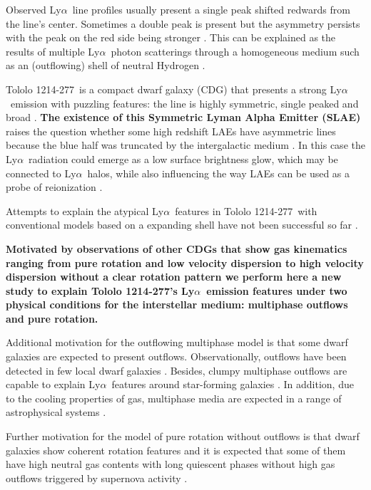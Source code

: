 \documentclass[a4paper,fleqn,usenatbib]{mnras}
\newcommand{\tol}{Tololo 1214-277}
\newcommand{\lya}{\ifmmode{{\rm Ly}\alpha}\else Ly$\alpha$\ \fi}
\begin{document}
Observed \lya line profiles usually present a single peak shifted
redwards from the line's center. 
Sometimes a double peak is present but the asymmetry persists with 
the peak on the red side being stronger \citep[e.g.][]{2010ApJ...717..289S,Erb14,Trainor16}. 
This can be explained as the results of multiple \lya photon
scatterings through a homogeneous medium such as an (outflowing) shell of neutral Hydrogen
\citep{2006A&A...460..397V,Orsi12,2012ApJ...751...29Y,2015ApJ...812..123G}.

\tol\ is a compact dwarf galaxy (CDG) that presents a
strong \lya emission with puzzling 
features: the line is highly symmetric, single peaked and broad 
\citep{Thuan97}.
{\bf The existence of this Symmetric Lyman Alpha Emitter (SLAE)} raises the question whether some high
redshift LAEs have asymmetric lines because the blue half was
truncated by the intergalactic medium \citep{2007MNRAS.377.1175D}. 
In this case the \lya radiation could emerge as a low surface
brightness glow, which may be connected to \lya halos, while also
influencing the way LAEs can be used as a probe of reionization
\citep[see the review by][and references therein]{2014PASA...31...40D}. 

Attempts to explain the atypical \lya features in \tol\ with
conventional models based on a expanding shell have not been successful
so far \citep{mashesse03,2015A&A...578A...7V}. 


{\bf Motivated by observations of other CDGs
  that show gas kinematics ranging from pure rotation and low velocity
dispersion to high velocity dispersion without a clear rotation pattern
\citep{2015A&A...577A..21C,2017A&A...600A.125C} we perform here a new
study to explain \tol's \lya emission features under two physical
conditions for the interstellar medium: multiphase outflows and pure rotation.}


Additional motivation for the outflowing multiphase model \citep[as presented
in][]{Gronke2016} is that some dwarf galaxies are expected to
present outflows.  
Observationally, outflows have been detected in few local dwarf galaxies
\citep{1998ApJ...506..222M,2005MNRAS.358.1453O}. 
Besides, clumpy multiphase outflows are capable to explain \lya features around
star-forming galaxies
\citep{2010ApJ...717..289S,2012MNRAS.424.1672D}.
In addition, due to the cooling properties of gas, multiphase media are expected
in a range of astrophysical systems
\citep[][]{1977ApJ...218..148M}. 

Further  motivation for the model of pure rotation without outflows 
\citep[as presented in][]{GaravitoCamargo2014} is that dwarf galaxies show coherent
rotation features  \citep{2009A&A...493..871S} and it is expected that
some of them have high neutral gas contents with long quiescent phases
without high gas outflows triggered by supernova activity
\citep{2005A&A...433L...1B,2008ApJ...672..888T,2013MNRAS.434.2491G}.   
\end{document}
